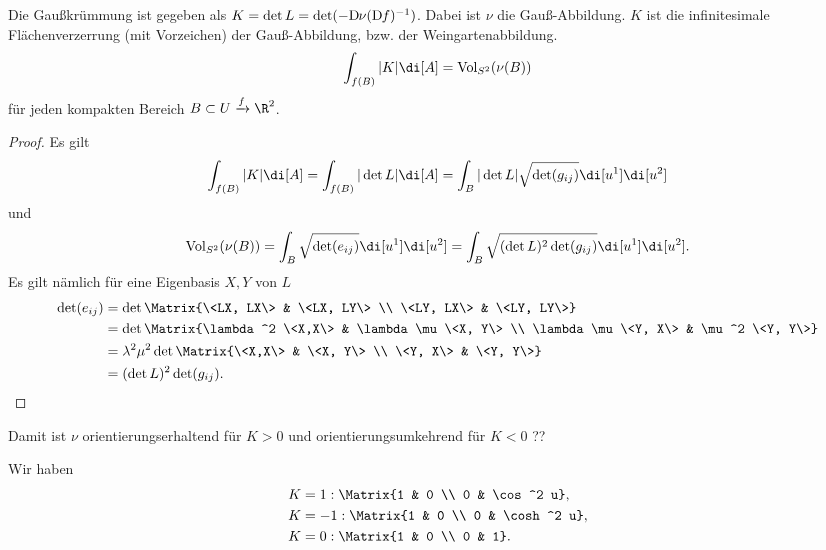 \begin{nt}
	Die Gaußkrümmung ist gegeben als $K = \det L = \det(-\Df[\nu] (\Df)^{-1})$.
	Dabei ist $\nu$ die Gauß-Abbildung.
	$K$ ist die infinitesimale Flächenverzerrung (mit Vorzeichen) der Gauß-Abbildung, bzw. der Weingartenabbildung.
	\[
		\int_{f(B)} |K| \di[A]
		= \Vol_{S^2}(\nu(B))
	\]
	für  jeden kompakten Bereich $B \subset U \xrightarrow{f} \R^2$.
	\begin{proof}
		Es gilt
		\[
			\int_{f(B)} |K| \di[A]
			= \int_{f(B)} |\det L| \di[A]
			= \int_{B} |\det L| \sqrt{\det (g_{ij})} \di[u^1]\di[u^2]
		\]
		und
		\[
			\Vol_{S^2}(\nu(B))
			= \int_{B}\sqrt{\det (e_{ij})} \di[u^1] \di[u^2]
			= \int_{B}\sqrt{(\det L)^2 \det(g_{ij})} \di[u^1]\di[u^2].
		\]
		Es gilt nämlich für eine Eigenbasis $X, Y$ von $L$
		\begin{align*}
			\det(e_{ij}) &= \det \Matrix{\<LX, LX\> & \<LX, LY\> \\ \<LY, LX\> & \<LY, LY\>} \\
			&= \det \Matrix{\lambda^2 \<X,X\> & \lambda\mu \<X, Y\> \\ \lambda\mu \<Y, X\> & \mu^2 \<Y, Y\>} \\
			&= \lambda^2 \mu^2 \det \Matrix{\<X,X\> & \<X, Y\> \\ \<Y, X\> & \<Y, Y\>} \\
			&= (\det L)^2 \det (g_{ij}).
		\end{align*}
	\end{proof}
	\begin{note}
		Damit ist $\nu$ orientierungserhaltend für $K > 0$ und orientierungsumkehrend für $K < 0$ ??
	\end{note}
\end{nt}

Wir haben
\begin{align*}
	K &= 1 : \Matrix{1 & 0 \\ 0 & \cos^2 u}, \\
	K &= -1 : \Matrix{1 & 0 \\ 0 & \cosh^2 u}, \\
	K &= 0 : \Matrix{1 & 0 \\ 0 & 1}.
\end{align*}





